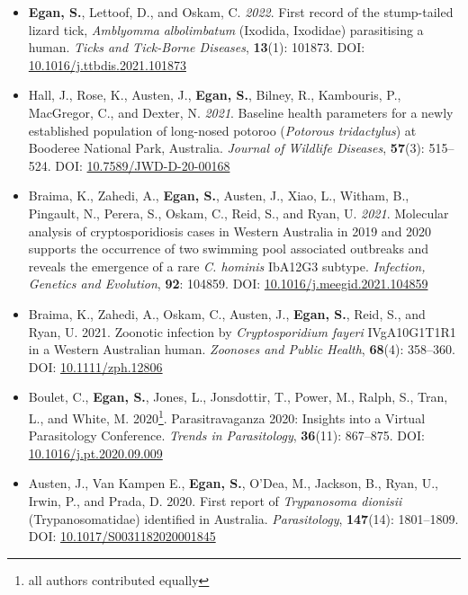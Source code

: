 \documentclass[a4paper, nobind]{templates/ociamthesis}
\providecommand{\tightlist}{%
  \setlength{\itemsep}{0pt}\setlength{\parskip}{0pt}}
\begin{document}
\begin{itemize}
\tightlist
\item
  \textbf{Egan, S.}, Lettoof, D., and Oskam, C. \emph{2022}. First record of the stump-tailed lizard tick, \emph{Amblyomma} \emph{albolimbatum} (Ixodida, Ixodidae) parasitising a human. \emph{Ticks and Tick-Borne Diseases}, \textbf{13}(1): 101873. DOI: \href{https://doi.org/10.1016/j.ttbdis.2021.101873}{10.1016/j.ttbdis.2021.101873}
\item
  Hall, J., Rose, K., Austen, J., \textbf{Egan, S.}, Bilney, R., Kambouris, P., MacGregor, C., and Dexter, N. \emph{2021}. Baseline health parameters for a newly established population of long-nosed potoroo (\emph{Potorous tridactylus}) at Booderee National Park, Australia. \emph{Journal of Wildlife Diseases}, \textbf{57}(3): 515--524. DOI: \href{https://doi.org/10.7589/JWD-D-20-00168}{10.7589/JWD-D-20-00168}
\item
  Braima, K., Zahedi, A., \textbf{Egan, S.}, Austen, J., Xiao, L., Witham, B., Pingault, N., Perera, S., Oskam, C., Reid, S., and Ryan, U. \emph{2021}. Molecular analysis of cryptosporidiosis cases in Western Australia in 2019 and 2020 supports the occurrence of two swimming pool associated outbreaks and reveals the emergence of a rare \emph{C. hominis} IbA12G3 subtype. \emph{Infection, Genetics and Evolution}, \textbf{92}: 104859. DOI: \href{https://doi.org/10.1016/j.meegid.2021.104859}{10.1016/j.meegid.2021.104859}
\item
  Braima, K., Zahedi, A., Oskam, C., Austen, J., \textbf{Egan, S.}, Reid, S., and Ryan, U. 2021. Zoonotic infection by \emph{Cryptosporidium fayeri} IVgA10G1T1R1 in a Western Australian human. \emph{Zoonoses and Public Health}, \textbf{68}(4): 358--360. DOI: \href{https://doi.org/10.1111/zph.12806}{10.1111/zph.12806}
\item
  Boulet, C., \textbf{Egan, S.}, Jones, L., Jonsdottir, T., Power, M., Ralph, S., Tran, L., and White, M. 2020\footnote{all authors contributed equally}. Parasitravaganza 2020: Insights into a Virtual Parasitology Conference. \emph{Trends in Parasitology}, \textbf{36}(11): 867--875. DOI: \href{https://doi.org/10.1016/j.pt.2020.09.009}{10.1016/j.pt.2020.09.009}
\item
  Austen, J., Van Kampen E., \textbf{Egan, S.}, O'Dea, M., Jackson, B., Ryan, U., Irwin, P., and Prada, D. 2020. First report of \emph{Trypanosoma dionisii} (Trypanosomatidae) identified in Australia. \emph{Parasitology}, \textbf{147}(14): 1801--1809. DOI: \href{https://doi.org/10.1017/S0031182020001845}{10.1017/S0031182020001845}

\end{itemize}
\end{document}

